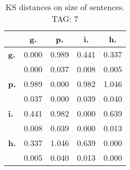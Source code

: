 \begin{table}[h!]
\begin{center}
\begin{tabular}{| l || c | c | c | c |}\hline
 & {\bf g.} & {\bf p.} & {\bf i.} & {\bf h.} \\\hline\hline
{\bf g.} & 0.000 & 0.989 & 0.441 & 0.337 \\
{\bf } & 0.000 & 0.037 & 0.008 & 0.005 \\\hline
{\bf p.} & 0.989 & 0.000 & 0.982 & 1.046 \\
{\bf } & 0.037 & 0.000 & 0.039 & 0.040 \\\hline
{\bf i.} & 0.441 & 0.982 & 0.000 & 0.639 \\
{\bf } & 0.008 & 0.039 & 0.000 & 0.013 \\\hline
{\bf h.} & 0.337 & 1.046 & 0.639 & 0.000 \\
{\bf } & 0.005 & 0.040 & 0.013 & 0.000 \\\hline
\end{tabular}
\caption{KS distances on size of sentences. TAG: 7}
\end{center}
\end{table}